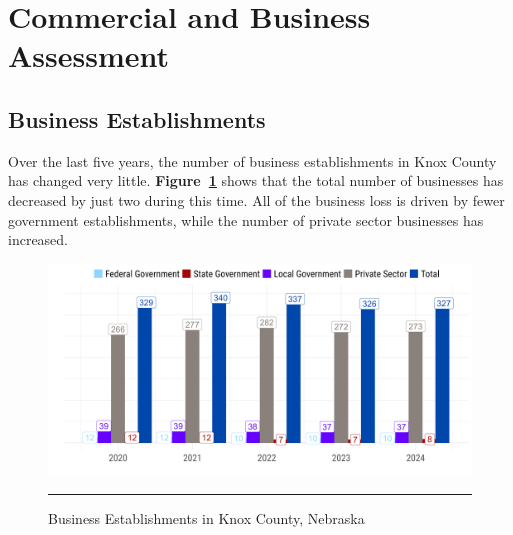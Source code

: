 \section{Commercial and Business Assessment}



\subsection{Business Establishments}

\noindent Over the last five years, the number of business establishments in Knox County has changed very little. \textbf{Figure~\ref{fig:bizEstablishments}} shows that the total number of businesses has decreased by just two during this time. All of the business loss is driven by fewer government establishments, while the number of private sector businesses has increased.

\begin{figure}[H]
\centering
\begin{framed}
    \caption{Business Establishments in Knox County, Nebraska}
    \label{fig:bizEstablishments}
    \includegraphics[width=\linewidth]{figures/knox_county_employers.png}
    \rule[-5pt]{\linewidth}{0.4pt}
\end{framed}
\end{figure}


